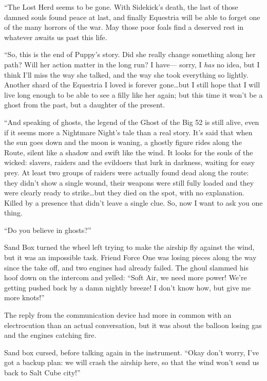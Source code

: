 {``The Lost Herd seems to be gone. With Sidekick's death, the last of those damned souls found peace at last, and finally Equestria will be able to forget one of the many horrors of the war. May those poor foals find a deserved rest in whatever awaits us past this life.

``So, this is the end of Puppy's story. Did she really change something along her path? Will her action matter in the long run? I have--- sorry, I \emph{has} no idea, but I think I'll miss the way she talked, and the way she took everything so lightly. Another shard of the Equestria I loved is forever gone\dots but I still hope that I will live long enough to be able to see a filly like her again; but this time it won't be a ghost from the past, but a daughter of the present.

``And speaking of ghosts, the legend of the Ghost of the Big 52 is still alive, even if it seems more a Nightmare Night's tale than a real story. It's said that when the sun goes down and the moon is waning, a ghostly figure rides along the Route, silent like a shadow and swift like the wind. It looks for the souls of the wicked: slavers, raiders and the evildoers that lurk in darkness, waiting for easy prey. At least two groups of raiders were actually found dead along the route: they didn't show a single wound, their weapons were still fully loaded and they were clearly ready to strike\dots but they died on the spot, with no explanation. Killed by a presence that didn't leave a single clue. So, now I want to ask you one thing.

``Do you believe in ghosts?''

}

\horizonline


Sand Box turned the wheel left trying to make the airship fly against the wind, but it was an impossible task. Friend Force One was losing pieces along the way since the take off, and two engines had already failed. The ghoul slammed his hoof down on the intercom and yelled: ``Soft Air, we need more power! We're getting pushed back by a damn nightly breeze! I don't know how, but give me more knots!''

The reply from the communication device had more in common with an electrocution than an actual conversation, but it was about the balloon losing gas and the engines catching fire.

Sand box cursed, before talking again in the instrument. ``Okay don't worry, I've got a backup plan: we will crash the airship here, so that the wind won't send us back to Salt Cube city!''


